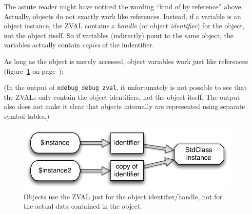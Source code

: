 The astute reader might have noticed the wording ``kind of by reference'' above. Actually, objects do not exactly work like references. Instead, if a variable is an object instance, the ZVAL contains a \emph{handle} (or object \emph{identifier}) for the object, not the object itself. So if variables (indirectly) point to the same object, the variables actually contain \emph{copies} of the indentifier.~\cite{php-manual-oop-references}

As long as the object is merely accessed, object variables work just like references (figure~\ref{fig:objects-as-references} on page~\pageref{fig:objects-as-references}):



(In the output of \texttt{xdebug\_debug\_zval}, it unfortunately is not possible to see that the ZVALs only contain the object identifiers, not the object itself. The output also does not make it clear that objects internally are represented using separate symbol tables.)

\begin{figure}[!h]
  \begin{center}
    \includegraphics[scale=0.8]{images/instance_instance2}
    \caption{Objects use the ZVAL just for the object identifier/handle, not for the actual data contained in the object.}
    \label{fig:objects-as-references}
  \end{center}
\end{figure}


